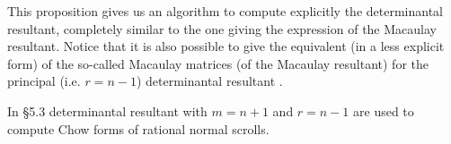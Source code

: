 \documentclass[10pt]{amsart}
\theoremstyle{plain}
\theoremstyle{definition}
\begin{document}
This proposition gives us an algorithm to compute explicitly 
the determinantal resultant, completely similar  
to the one giving the expression of the Macaulay resultant. Notice
that it is also possible to give the equivalent (in a less 
explicit form) of the 
so-called Macaulay matrices (of the Macaulay resultant) for the
principal (i.e. $r=n-1$) determinantal resultant \cite{BusPhD,Bus04}. 

In \cite{Bus04} \S5.3 determinantal resultant with $m=n+1$ and $r=n-1$ are used to compute Chow forms of rational normal scrolls. 


\def\cprime{$'$}
\providecommand{\bysame}{\leavevmode\hbox to3em{\hrulefill}\thinspace}
\providecommand{\MR}{\relax\ifhmode\unskip\space\fi MR }
\providecommand{\MRhref}[2]{%
  \href{http://www.ams.org/mathscinet-getitem?mr=#1}{#2}
}
\providecommand{\href}[2]{#2}
\end{document}
